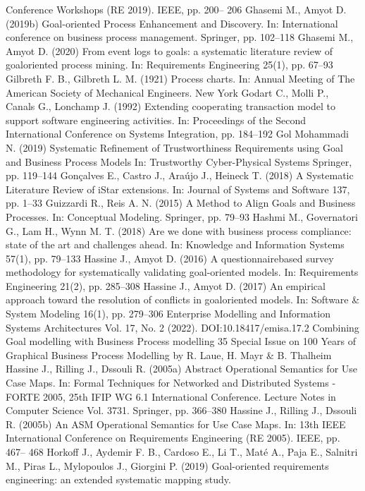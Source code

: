 Conference Workshops (RE 2019). IEEE, pp. 200–
206
Ghasemi M., Amyot D. (2019b) Goal-oriented
Process Enhancement and Discovery. In: International conference on business process management. Springer, pp. 102–118
Ghasemi M., Amyot D. (2020) From event logs
to goals: a systematic literature review of goaloriented process mining. In: Requirements Engineering 25(1), pp. 67–93
Gilbreth F. B., Gilbreth L. M. (1921) Process
charts. In: Annual Meeting of The American Society of Mechanical Engineers. New York
Godart C., Molli P., Canals G., Lonchamp J. (1992)
Extending cooperating transaction model to support software engineering activities. In: Proceedings of the Second International Conference on
Systems Integration, pp. 184–192
Gol Mohammadi N. (2019) Systematic Refinement of Trustworthiness Requirements using Goal
and Business Process Models In: Trustworthy
Cyber-Physical Systems Springer, pp. 119–144
Gonçalves E., Castro J., Araújo J., Heineck T.
(2018) A Systematic Literature Review of iStar
extensions. In: Journal of Systems and Software
137, pp. 1–33
Guizzardi R., Reis A. N. (2015) A Method to Align
Goals and Business Processes. In: Conceptual
Modeling. Springer, pp. 79–93
Hashmi M., Governatori G., Lam H., Wynn M. T.
(2018) Are we done with business process compliance: state of the art and challenges ahead.
In: Knowledge and Information Systems 57(1),
pp. 79–133
Hassine J., Amyot D. (2016) A questionnairebased survey methodology for systematically validating goal-oriented models. In: Requirements
Engineering 21(2), pp. 285–308
Hassine J., Amyot D. (2017) An empirical approach toward the resolution of conflicts in goaloriented models. In: Software & System Modeling
16(1), pp. 279–306
Enterprise Modelling and Information Systems Architectures
Vol. 17, No. 2 (2022). DOI:10.18417/emisa.17.2
Combining Goal modelling with Business Process modelling 35
Special Issue on 100 Years of Graphical Business Process Modelling by R. Laue, H. Mayr & B. Thalheim
Hassine J., Rilling J., Dssouli R. (2005a) Abstract
Operational Semantics for Use Case Maps. In:
Formal Techniques for Networked and Distributed
Systems - FORTE 2005, 25th IFIP WG 6.1 International Conference. Lecture Notes in Computer
Science Vol. 3731. Springer, pp. 366–380
Hassine J., Rilling J., Dssouli R. (2005b) An ASM
Operational Semantics for Use Case Maps. In:
13th IEEE International Conference on Requirements Engineering (RE 2005). IEEE, pp. 467–
468
Horkoff J., Aydemir F. B., Cardoso E., Li T., Maté
A., Paja E., Salnitri M., Piras L., Mylopoulos J.,
Giorgini P. (2019) Goal-oriented requirements engineering: an extended systematic mapping study.
